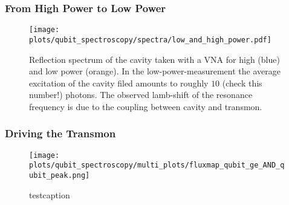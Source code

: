 


\subsubsection{From High Power to Low Power}
\label{subsec:characterizing_the_system:from_high_to_low_power}



\begin{figure}[htb!]
\centering
\texttt{[image: plots/qubit\_spectroscopy/spectra/low\_and\_high\_power.pdf]}
\caption{
Reflection spectrum of the cavity taken with a VNA for high (blue) and low power (orange). In the low-power-measurement the average excitation of the cavity filed amounts to roughly $10$ (check this number!) photons. The observed lamb-shift of the resonance frequency is due to the coupling between cavity and transmon.
}
\label{fig:cavity_spectroscopy:from_high_to_power}
\end{figure}







\subsubsection{Driving the Transmon}



\begin{figure}
\centering
\texttt{[image: plots/qubit\_spectroscopy/multi\_plots/fluxmap\_qubit\_ge\_AND\_qubit\_peak.png]}
\caption{testcaption}
\label{testlabel}
\end{figure}




